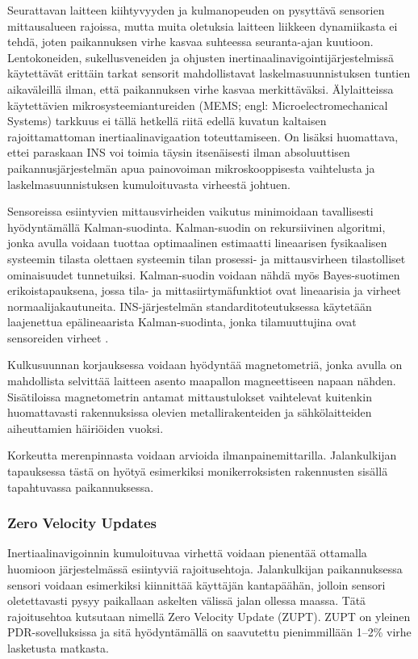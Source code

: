 Seurattavan laitteen kiihtyvyyden ja kulmanopeuden on pysyttävä sensorien
mittausalueen rajoissa, mutta muita oletuksia laitteen liikkeen dynamiikasta ei
tehdä, joten paikannuksen virhe kasvaa suhteessa seuranta-ajan kuutioon.
Lentokoneiden, sukellusveneiden ja ohjusten inertinaalinavigointijärjestelmissä
käytettävät erittäin tarkat sensorit mahdollistavat laskelmasuunnistuksen
tuntien aikaväleillä ilman, että paikannuksen virhe kasvaa merkittäväksi.
Älylaitteissa käytettävien mikrosysteemiantureiden (MEMS; engl:
Microelectromechanical Systems) tarkkuus ei tällä hetkellä riitä edellä kuvatun
kaltaisen rajoittamattoman inertiaalinavigaation toteuttamiseen. On lisäksi
huomattava, ettei paraskaan INS voi toimia täysin itsenäisesti ilman
absoluuttisen paikannusjärjestelmän apua painovoiman mikroskooppisesta
vaihtelusta ja laskelmasuunnistuksen kumuloituvasta virheestä johtuen.

Sensoreissa esiintyvien mittausvirheiden vaikutus minimoidaan tavallisesti
hyödyntämällä Kalman-suodinta.
Kalman-suodin on rekursiivinen algoritmi,
jonka avulla voidaan tuottaa optimaalinen estimaatti lineaarisen
fysikaalisen systeemin
tilasta olettaen systeemin tilan prosessi- ja mittausvirheen tilastolliset
ominaisuudet tunnetuiksi. Kalman-suodin voidaan nähdä myös Bayes-suotimen
erikoistapauksena,
jossa tila- ja mittasiirtymäfunktiot ovat lineaarisia ja virheet
normaalijakautuneita. INS-järjestelmän standarditoteutuksessa
käytetään laajenettua epälineaarista Kalman-suodinta, jonka tilamuuttujina
ovat sensoreiden virheet \cite{foxlin2005}.

Kulkusuunnan korjauksessa voidaan hyödyntää magnetometriä, jonka avulla on
mahdollista selvittää laitteen asento maapallon magneettiseen napaan nähden.
Sisätiloissa magnetometrin antamat mittaustulokset vaihtelevat kuitenkin
huomattavasti rakennuksissa olevien metallirakenteiden ja sähkölaitteiden
aiheuttamien häiriöiden vuoksi.

Korkeutta merenpinnasta voidaan arvioida ilmanpainemittarilla. Jalankulkijan
tapauksessa tästä on hyötyä esimerkiksi monikerroksisten rakennusten
sisällä tapahtuvassa paikannuksessa.

\subsubsection{Zero Velocity Updates}

Inertiaalinavigoinnin kumuloituvaa virhettä voidaan pienentää ottamalla
huomioon järjestelmässä esiintyviä rajoitusehtoja. Jalankulkijan paikannuksessa
sensori voidaan esimerkiksi kiinnittää käyttäjän kantapäähän, jolloin
sensori oletettavasti pysyy paikallaan askelten välissä jalan ollessa maassa.
Tätä rajoitusehtoa kutsutaan nimellä Zero Velocity Update (ZUPT).
ZUPT on yleinen PDR-sovelluksissa ja sitä hyödyntämällä on saavutettu
pienimmillään 1--2\% virhe lasketusta matkasta.

